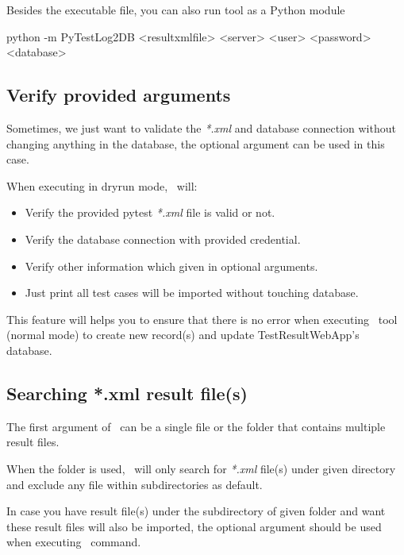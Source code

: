     Besides the executable file, you can also run tool as a Python module

\begin{robotlog}
python -m PyTestLog2DB <resultxmlfile> <server> <user> <password> <database>
\end{robotlog}

  \hypertarget{verify-provided-arguments}{%
  \subsection{Verify provided arguments}\label{verify-provided-arguments}}

    Sometimes, we just want to validate the \emph{*.xml} and database
    connection without changing anything in the database, the optional
    argument  can be used in this case.

    When executing in dryrun mode, \pkg\ will:

    \begin{itemize}
      \item
        Verify the provided pytest \emph{*.xml} file is valid or not.
      \item
        Verify the database connection with provided credential.
      \item
        Verify other information which given in optional arguments.
      \item
        Just print all test cases will be imported without touching database.
    \end{itemize}

    This feature will helps you to ensure that there is no error when
    executing \pkg\ tool (normal mode) to create new record(s) and
    update TestResultWebApp's database.

  \hypertarget{searching-.xml-result-files}{%
  \subsection{Searching *.xml result file(s)}}
  \label{searching-.xml-result-files}

    The first argument  of \pkg\ can be a single file or the
    folder that contains multiple result files.

    When the folder is used, \pkg\ will only search for \emph{*.xml} file(s)
    under given directory and exclude any file within subdirectories as default.

    In case you have result file(s) under the subdirectory of given folder and
    want these result files will also be imported, the optional argument
     should be used when executing \pkg\ command.

